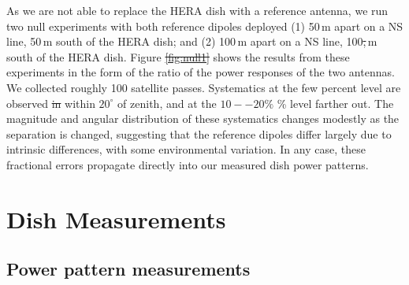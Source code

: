 \documentclass{emulateapj}
\providecommand{\DIFadd}[1]{{\protect\color{blue}\uwave{#1}}} %
\providecommand{\DIFdel}[1]{{\protect\color{red}\sout{#1}}}                      %
\providecommand{\DIFaddbegin}{} %
\providecommand{\DIFaddend}{} %
\providecommand{\DIFdelbegin}{} %
\providecommand{\DIFdelend}{} %
\begin{document}
As we are not able to replace the HERA dish with a reference antenna, we run two null experiments with both reference dipoles deployed (1) 50\,m apart on a NS line, 50\,m south of the HERA dish; and (2) 100\,m apart on a NS line, 100\DIFdelbegin \DIFdel{,}\DIFdelend \DIFaddbegin \,\DIFaddend m south of the HERA dish. Figure \DIFdelbegin \DIFdel{\ref{fig:null1} }\DIFdelend \DIFaddbegin \DIFadd{\ref{fig:nullexptplots} }\DIFaddend shows the results from these experiments in the form of the ratio of the power responses of the two antennas. We collected roughly 100 satellite passes. Systematics at the few percent level are observed \DIFdelbegin \DIFdel{in  }\DIFdelend within $20^\circ$ of zenith, and at the \DIFdelbegin \DIFdel{$10--20\%$ }\DIFdelend \DIFaddbegin \DIFadd{10--20}\% \DIFaddend level farther out. The magnitude and angular distribution of these systematics changes modestly as the separation is changed, suggesting that the reference dipoles differ largely due to intrinsic differences, with some environmental variation. In any case, these fractional errors propagate directly into our measured dish power patterns.

\section{Dish Measurements}

\subsection{Power pattern measurements}
\DIFaddbegin \label{sec:powerpatternmeasurements}
\DIFaddend 
\end{document}
